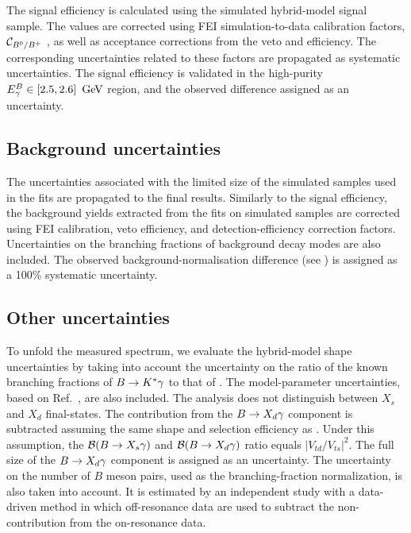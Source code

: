 The signal efficiency is calculated using the simulated hybrid-model signal sample. The values are corrected using FEI simulation-to-data calibration factors, $\mathcal{C}_{B^0/B^+}$ \cite{Belle-II:2020fst}, as well as acceptance corrections from the \piz veto and \g efficiency. The corresponding uncertainties related to these factors are propagated as systematic uncertainties. The signal efficiency is validated in the high-purity ${E^B_{\gamma}} \in [2.5, 2.6]~\mathrm{\,Ge\kern -0.1em V}$ region, and the observed difference assigned as an uncertainty. 

\subsection{Background uncertainties}\label{sec:background_uncertainty}

The uncertainties associated with the limited size of the simulated samples used in the \Mbc fits are propagated to the final results. Similarly to the signal efficiency, the background yields extracted from the fits on simulated samples are corrected using FEI calibration, \piz veto efficiency, and \g detection-efficiency correction factors. Uncertainties on the branching fractions of background decay modes are also included. The observed background-normalisation difference (see ) is assigned as a 100\% systematic uncertainty. 


\subsection{Other uncertainties}\label{sec:other_uncertainty}

To unfold the measured \EB spectrum, we evaluate the hybrid-model shape uncertainties by taking into account the uncertainty on the ratio of the known branching fractions of $B\rightarrow K^*\gamma$ to that of  \BtoXsgamma. The \BtoXsgamma model-parameter uncertainties, based on Ref.~\cite{simba}, are also included. The analysis does not distinguish between $X_s$ and $X_d$ final-states. The contribution from the $B\rightarrow X_d\gamma$ component is subtracted assuming the same shape and selection efficiency as \BtoXsgamma. Under this assumption, the $\mathcal{B}({B\rightarrow X_{s} \gamma})$ and $\mathcal{B}(B\rightarrow X_d\gamma)$ ratio equals $\left|{V_{td}}/{V_{ts}}\right|^2$. The full size of the $B\rightarrow X_d\gamma$ component is assigned as an uncertainty. The uncertainty on the number of $B$ meson pairs, used as the branching-fraction normalization, is also taken into account. It is estimated by an independent study with a data-driven method in which off-resonance data are used to subtract the non-\BB contribution from the on-resonance data.


